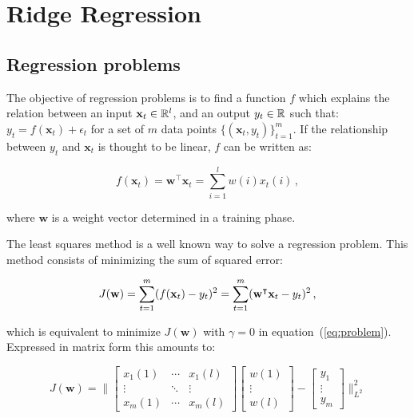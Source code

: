 \section{Ridge Regression}
\subsection{Regression problems}
The objective of regression problems is to find a function $f$ which
explains the relation between an input $\mathbf{x}_t \in {\mathbb R }^l$, and an
output $y_t \in {\mathbb R }$ such that: $y_t=f(\mathbf{x}_t) + \epsilon_t$ for
a set of $m$ data points $\{( \mathbf{x}_t,y_t)\}_{t=1}^m$.  If the
relationship between $y_t$ and $\mathbf{x}_t$ is thought to
be linear, $f$ can be written as:

\begin{equation*}
f(\mathbf{x}_t)=\mathbf{w}^\intercal \mathbf{x}_t=\sum_{i=1}^l
w(i)x_t(i) \, ,
\end{equation*}

\noindent where $\mathbf{w}$ is a  weight vector determined in a training phase.

The least squares method is a well known way to solve a regression
problem. This method consists of minimizing the sum of squared error:


\begin{equation}
\label{eq:problem2}
 J(\mathbf{w}) = \sum_{t=1}^m (f(\mathbf{x}_t)-y_t)^2 = \sum_{t=1}^m
 (\mathbf{w}^\intercal {\bf x}_t-y_t)^2 \, ,
\end{equation}

\noindent which is equivalent to minimize $J(\mathbf{w})$ with $\gamma = 0$ in
equation~(\ref{eq:problem}). 
Expressed in matrix form this amounts to: %

\begin{equation*}
J(\mathbf{w})=
	\big\|
       \begin{bmatrix}
       x_1(1) & \cdots & x_1(l) \\
       \vdots & \ddots & \vdots \\
       x_m(1) & \cdots & x_m(l)
       \end{bmatrix}
       \begin{bmatrix}
       w(1)\\
       \vdots \\
       w(l) 
       \end{bmatrix}-
       \begin{bmatrix}
        y_1\\
        \vdots \\
        y_m 
        \end{bmatrix}
       \big\|_{L^2}^2
\end{equation*}  

